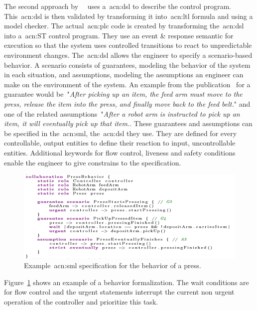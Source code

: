 The second approach by~\citeauthor{10.1007/978-3-319-74730-9_23}~\cite{10.1007/978-3-319-74730-9_23} uses a~\acrfull{acn:dsl} to describe the control program.
This~\acrshort{acn:dsl} is then validated by transforming it into~\acrshort{acn:ltl} formula and using a model checker.
The actual~\acrshort{acn:plc} code is created by transforming the~\acrshort{acn:dsl} into a~\acrshort{acn:ST} control program.
They use an event \& response semantic for execution so that the system uses controlled transitions to react to unpredictable environment changes.
The~\acrshort{acn:dsl} allows the engineer to specify a scenario-based behavior.
A scenario consists of guarantees, modeling the behavior of the system in each situation, and assumptions, modeling the assumptions an engineer can make on the environment of the system.
An example from the publication~\cite{10.1007/978-3-319-74730-9_23} for a guarantee would be~"\textit{After picking up an item, the feed arm must move to the press, release the item into the press, and finally move back to the feed belt.}" and one of the related assumptions~"\textit{After a robot arm is instructed to pick up an item, it will eventually pick up that item.}.
These guarantees and assumptions can be specified in the~\acrfull{acn:sml}, the~\acrshort{acn:dsl} they use.
They are defined for every controllable, output entities to define their reaction to input, uncontrollable entities.
Additional keywords for flow control, liveness and safety conditions enable the engineer to give constrains to the specification.
\begin{figure}
	\centering
	\includegraphics[width=\textwidth]{./Figures/sml_press_beh.png}
	\caption[\acrshort{acn:sml} specification example.]{Example~\acrshort{acn:sml} specification for the behavior of a press.~\cite{10.1007/978-3-319-74730-9_23}}
	\label{fig:sml_press}
\end{figure}
Figure~\ref{fig:sml_press} shows an example of a behavior formalization.
The wait conditions are for flow control and the urgent statements interrupt the current non urgent operation of the controller and prioritize this task.
